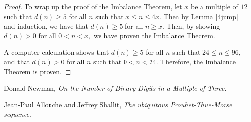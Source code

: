 \documentclass{article}
\begin{document}
\begin{proof}
To wrap up the proof of the Imbalance Theorem, let $x$ be a multiple of $12$ such that $d(n) \geq 5$ for all $n$ such that $x \leq n \leq 4x.$ Then by Lemma \ref{4jump} and induction, we have that $d(n) \geq 5$ for all $n \geq x.$ Then, by showing $d(n) > 0$ for all $0 < n < x,$ we have proven the Imbalance Theorem.

A computer calculation shows that $d(n) \geq 5$ for all $n$ such that $24 \leq n \leq 96,$ and that $d(n) > 0$ for all $n$ such that $0 < n < 24.$ Therefore, the Imbalance Theorem is proven.
\end{proof}

\begin{thebibliography}{9}

Donald Newman, \emph{On the Number of Binary Digits in a Multiple of Three}.

Jean-Paul Allouche and Jeffrey Shallit, \emph{The ubiquitous Prouhet-Thue-Morse sequence}.

\end{thebibliography}
\end{document}
